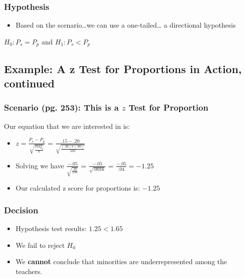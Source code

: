 \documentclass[]{article}
\begin{document}
\subsubsection{Hypothesis}\label{hypothesis-1}

\begin{itemize}
\itemsep1pt\parskip0pt
\item
  Based on the scenario\ldots{}we can use a one-tailed\ldots{} a
  directional hypothesis
\end{itemize}

$H_0: P_s = P_p$ and $H_1: P_s < P_p$

\subsection{Example: A z Test for Proportions in Action,
continued}\label{example-a-z-test-for-proportions-in-action-continued}

\subsubsection{Scenario (pg. 253): This is a $z$ Test for
Proportion}\label{scenario-pg.-253-this-is-a-z-test-for-proportion-1}

Our equation that we are interested in is:

\begin{itemize}
\item
  $z = \frac{P_s - P_p}{\sqrt{\frac{P_PQ_p}{n}}}$ =
  $\frac{.15 - .20}{\sqrt{\frac{(.20) x (.80)}{100}}}$
\item
  Solving we have $\frac{-.05}{\sqrt{\frac{.16}{100}}}$ =
  $\frac{-.05}{\sqrt{.0016}}$ = $\frac{-.05}{.04}=-1.25$
\item
  Our calculated z score for proportions is: $-1.25$
\end{itemize}

\subsubsection{Decision}\label{decision}

\begin{itemize}
\itemsep1pt\parskip0pt
\item
  Hypothesis test results: $1.25 < 1.65$
\item
  We fail to reject $H_0$
\item
  We \textbf{cannot} conclude that minorities are underrepresented among
  the teachers.
\end{itemize}
\end{document}
